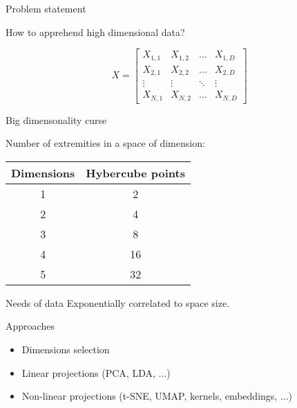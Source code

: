 \begin{frame}{Problem statement}
    \begin{center}
      How to apprehend high dimensional data?
    \end{center}
    \[
    X = \begin{bmatrix}
      X_{1,1} & X_{1,2} & \dots  & X_{1,D} \\
      X_{2,1} & X_{2,2} & \dots  & X_{2,D} \\
      \vdots & \vdots & \ddots & \vdots \\
      X_{N,1} & X_{N,2} & \dots  & X_{N,D}
    \end{bmatrix}
    \]
\end{frame}

\begin{frame}{Big dimensonality curse}
    \begin{center}
      Number of extremities in a space of dimension: \\
      $\;$ \\
      \begin{tabular}{cc}
        Dimensions & Hybercube points \\
        \midrule
        1 & 2 \\
        2 & 4 \\
        3 & 8 \\
        4 & 16 \\
        5 & 32 \\
      \end{tabular}
    \end{center}

  \begin{alertblock}{Needs of data}
    Exponentially correlated to space size.
  \end{alertblock}
\end{frame}

\begin{frame}{Approaches}
  \begin{itemize}
  \item Dimensions selection
  \item Linear projections (PCA, LDA, ...)
  \item Non-linear projections (t-SNE, UMAP, kernels, embeddings, ...)
  \end{itemize}
\end{frame}
